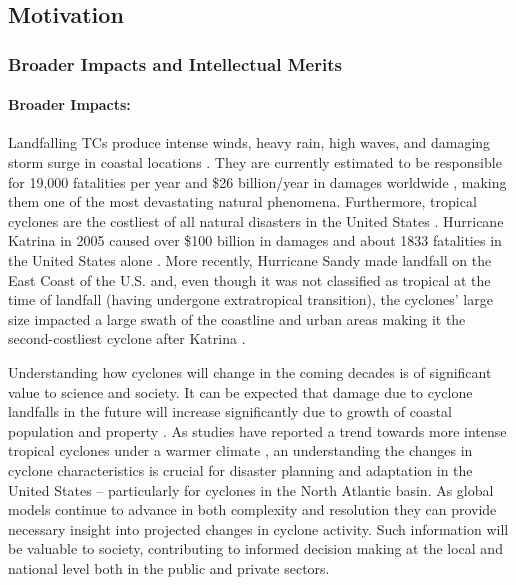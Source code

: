 \documentclass[11pt]{article}
\begin{document}
\subsection{Motivation} \label{sec:Motivation}

\subsubsection{Broader Impacts and Intellectual Merits}

\paragraph{Broader Impacts:}  

Landfalling TCs produce intense winds, heavy rain, high waves, and damaging storm surge in coastal locations \citep{EmanuelDivineWind}. They are currently estimated to be responsible for 19,000 fatalities per year and \$26 billion/year in damages worldwide \citep{Mendelsohn2012}, making them one of the most devastating natural phenomena. Furthermore, tropical cyclones are the costliest of all natural disasters in the United States \citep{Pielke1998}. Hurricane Katrina in 2005 caused over \$100 billion in damages and about 1833 fatalities in the United States alone \citep{Blake2011}. More recently, Hurricane Sandy made landfall on the East Coast of the U.S. and, even though it was not classified as tropical at the time of landfall (having undergone extratropical transition), the cyclones' large size impacted a large swath of the coastline and urban areas making it the second-costliest cyclone after Katrina \citep{Blake2013}.  

Understanding how cyclones will change in the coming decades is of significant value to science and society. It can be expected that damage due to cyclone landfalls in the future will increase significantly due to growth of coastal population and property \citep{Pielke2008}. As studies have reported a trend towards more intense tropical cyclones under a warmer climate \citep{Knutson2010}, an understanding the changes in cyclone characteristics is crucial for disaster planning and adaptation in the United States -- particularly for cyclones in the  North Atlantic basin. As global models continue to advance in both complexity and resolution they can provide necessary insight into projected changes in cyclone activity.  Such information will be valuable to society, contributing to informed decision making at the local and national level both in the public and private sectors.
\end{document}
